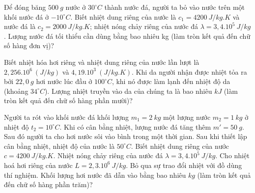 \begin{ex}%
	Để đóng băng $500\ g$ nước ở $30^\circ C$ thành nước đá, người ta bỏ vào nước trên một khối nước đá ở $-10^\circ C$. Biết nhiệt dung riêng của nước là $c_1 = 4200\ J/kg.K$ và nước đá là $c_2 = 2000\ J/kg.K$; nhiệt nóng chảy riêng của nước đá $\lambda = 3,4.10^5\ J/kg$. Lượng nước đá tối thiểu cần dùng bằng bao nhiêu kg (làm tròn kết quả đến chữ số hàng đơn vị)?
	
\end{ex}

\begin{ex}%
	Biết nhiệt hóa hơi riêng và nhiệt dung riêng của nước lần lượt là $2,256. 10^6\ (J/kg)$ và $4,19.  10^3\ (J/kg.K)$. Khi da người nhận được nhiệt tỏa ra bởi $22,0\ g$ hơi nước lúc đầu ở $100^\circ C$, khi nó được làm lạnh đến nhiệt độ da (khoảng $34^\circ C$). Lượng nhiệt truyền vào da của chúng ta là bao nhiêu $kJ$ (làm tròn kết quả đến chữ số hàng phần mười)? 
\end{ex}

\begin{ex}%
	Người ta rót vào khối nước đá khối lượng $m_1 = 2\ kg$ một lượng nước $m_2 = 1\ kg$ ở nhiệt độ $t_2 = 10^\circ C$. Khi có cân bằng nhiệt, lượng nước đá tăng thêm $m' = 50\ g$. Sau đó người ta cho hơi nước sôi vào bình trong một thời gian. Sau khi thiết lập cân bằng nhiệt, nhiệt độ của nước là $50^\circ C$. Biết nhiệt dung riêng của nước $c = 4200\ J/kg.K$. Nhiệt nóng chảy riêng của nước đá $\lambda = 3,4.10^5\ J/kg$. Cho nhiệt hoá hơi riêng của nước $L = 2,3.10^6\ J/kg$. Bỏ qua sự trao đổi nhiệt với đồ dùng thí nghiệm. Khối lượng hơi nước đã dẫn vào bằng bao nhiêu $kg$ (làm tròn kết quả đến chữ số hàng phần trăm)?
\end{ex}

